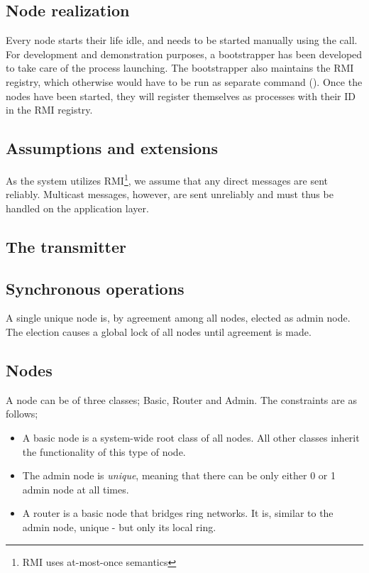\documentclass[10pt,a4paper]{article}
\begin{document}
\subsection{Node realization}
Every node starts their life idle, and needs to be started manually using the  call. For development and demonstration purposes, a bootstrapper has been developed to take care of the process launching. The bootstrapper also maintains the RMI registry, which otherwise would have to be run as separate command ().
Once the nodes have been started, they will register themselves as processes with their ID in the RMI registry.

\subsection{Assumptions and extensions}
As the system utilizes RMI\footnote{RMI uses at-most-once semantics}, we assume that any direct messages are sent reliably. Multicast messages, however, are sent unreliably and must thus be handled on the application layer.\\


\subsection{The transmitter}

\subsection{Synchronous operations}

A single unique node is, by agreement among all nodes, elected as admin node. The election causes a global lock of all nodes until agreement is made.
\subsection{Nodes}
A node can be of three classes; Basic, Router and Admin. The constraints are as follows;
\begin{itemize}
\item A basic node is a system-wide root class of all nodes. All other classes inherit the functionality of this type of node.
\item The admin node is \emph{unique}, meaning that there can be only either 0 or 1 admin node at all times.
\item A router is a basic node that bridges ring networks. It is, similar to the admin node, unique - but only its local ring.
\end{itemize}
\end{document}
